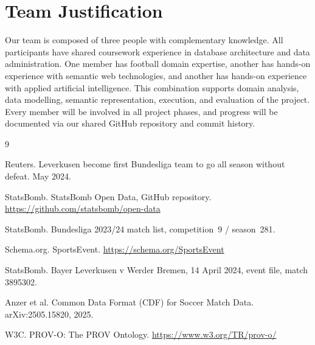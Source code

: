 \documentclass[sigconf,nonacm]{acmart}
\begin{document}
\section{Team Justification}
Our team is composed of three people with complementary knowledge. All
participants have shared coursework experience in database architecture and
data administration. One member has football domain expertise, another has
hands-on experience with semantic web technologies, and another has hands-on
experience with applied artificial intelligence. This combination supports
domain analysis, data modelling, semantic representation, execution, and
evaluation of the project. Every member will be involved in all project phases,
and progress will be documented via our shared GitHub repository and commit
history.

\begin{thebibliography}{9}

Reuters.
\newblock Leverkusen become first Bundesliga team to go all season without
  defeat.
 May 2024.

StatsBomb.
\newblock StatsBomb Open Data, GitHub repository.
\newblock \url{https://github.com/statsbomb/open-data}

StatsBomb.
\newblock Bundesliga 2023/24 match list, competition~9 / season~281.

Schema.org.
\newblock SportsEvent.
\newblock \url{https://schema.org/SportsEvent}

StatsBomb.
\newblock Bayer Leverkusen v Werder Bremen, 14 April 2024, event file, match
  3895302.

Anzer et al.
\newblock Common Data Format (CDF) for Soccer Match Data.
\newblock arXiv:2505.15820, 2025.

W3C.
\newblock PROV-O: The PROV Ontology.
\newblock \url{https://www.w3.org/TR/prov-o/}

\end{thebibliography}
\end{document}
